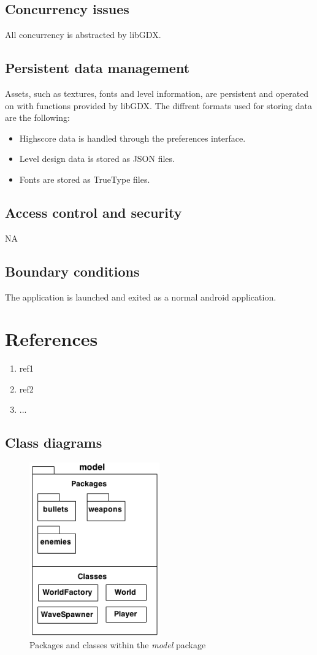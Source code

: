 \documentclass{article}
\begin{document}
\subsection{Concurrency issues}
All concurrency is abstracted by libGDX.

\subsection{Persistent data management}
Assets, such as textures, fonts and level information, are persistent and operated on with functions provided by libGDX. The diffrent formats used for storing data are the following: 
\begin{itemize}
  \item Highscore data is handled through the preferences interface.
  \item Level design data is stored as JSON files.
  \item Fonts are stored as TrueType files.
\end{itemize}

\subsection{Access control and security}
NA


\subsection{Boundary conditions}
The application is launched and exited as a normal android application.

\section{References}
\begin{enumerate}
  \item ref1
  \item ref2
  \item ...
\end{enumerate}

\newpage
\begin{appendices}
  \section{Class diagrams}
   
  \begin{figure}[h]
  \centering
  \includegraphics[width=0.5\textwidth]{model.png}
  \caption{Packages and classes within the \textit{model} package}
  \label{fig:model}
  \end{figure}  
  
\end{appendices}
\end{document}
